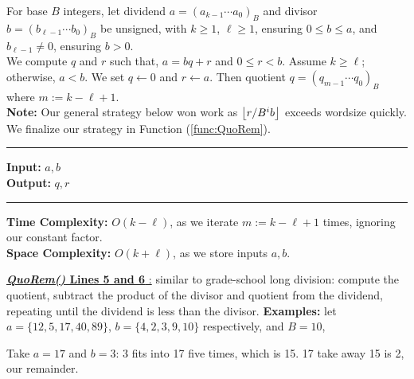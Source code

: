 \begin{Func}

    \label{func:QuoRem_out}

    For base $B$ integers, let dividend $a = (a_{k-1} \cdots a_0)_B$ and divisor $b = (b_{\ell-1} \cdots b_0)_B$ be unsigned, with $k \geq 1$,
    $\ell \geq 1$, ensuring $0\leq b\leq a$, and $b_{\ell-1} \neq 0$, ensuring $b>0$.\\ 
    
    \noindent
    We compute $q$ and $r$ such that, $a = bq + r$ and $0 \leq r < b$. 
    Assume $k \geq \ell$; otherwise, $a < b$. We set $q \gets 0$ and $r \gets a$. 
    Then quotient $q = (q_{m-1} \cdots q_0)_B$ where $m := k - \ell + 1$.\\

    \noindent
    \textbf{Note:} Our general strategy below won work as $\floor*{r/B^ib}$ exceeds wordsize quickly. We finalize our strategy in Function (\ref{func:QuoRem}).

    \noindent\rule{\textwidth}{0.4pt}

    \vspace{.5em}
    \noindent
    \textbf{Input:} $a, b$\\
    \noindent
    \textbf{Output:} $q, r$\\
    \begin{algorithm}[H]
        \SetAlgoLined
    \end{algorithm}

    \noindent\rule{\textwidth}{0.4pt}

    \noindent
    \textbf{Time Complexity:} $O(k-\ell)$, as we iterate $m := k - \ell + 1$ times, ignoring our constant factor.\\
    \textbf{Space Complexity:} $O(k+\ell)$, as we store inputs $a, b$.
\end{Func}
\noindent
\underline{\textbf{\textit{QuoRem()} Lines 5 and 6 }:} similar to grade-school long division: compute the quotient, subtract the product of the divisor and quotient from the dividend, repeating until the dividend is less than the divisor.
\textbf{Examples:} let $a=\{12,5,17,40,89\}$, $b=\{4,2,3,9,10\}$ respectively, and $B=10$,
\begin{center}
        
\end{center}
\noindent
Take $a=17$ and $b=3$: 3 fits into 17 five times, which is 15. 17 take away 15 is 2, our remainder.

